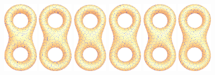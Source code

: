 \begin{figure}[htbp]
{\includegraphics[width=0.15\textwidth]{figs/cvt/eight_lbfgs_itr4.png}
\includegraphics[width=0.15\textwidth]{figs/cvt/eight_lbfgs_itr8.png}
\includegraphics[width=0.15\textwidth]{figs/cvt/eight_lbfgs_itr16.png}
\includegraphics[width=0.15\textwidth]{figs/cvt/eight_lbfgs_itr32.png}
\includegraphics[width=0.15\textwidth]{figs/cvt/eight_lbfgs_itr64.png}
\includegraphics[width=0.15\textwidth]{figs/cvt/eight_lbfgs_itr100.png}}\\

\end{figure}
